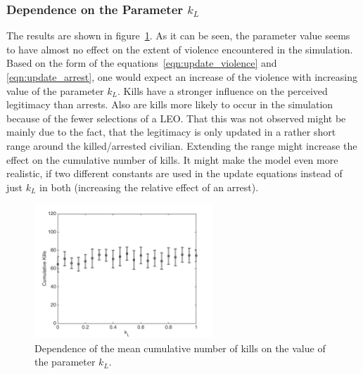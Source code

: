 \documentclass[11pt]{article}
\begin{document}
\subsubsection{Dependence on the Parameter $k_L$}
The results are shown in figure~\ref{fig:k_L_dep}. As it can be seen, the parameter value seems to have almost no effect on the extent of violence encountered in the simulation. Based on the form of the equations~\eqref{eqn:update_violence} and \eqref{eqn:update_arrest}, one would expect an increase of the violence with increasing value of the parameter $k_L$. Kills have a stronger influence on the perceived legitimacy than arrests. Also are kills more likely to occur in the simulation because of the fewer selections of a LEO. That this was not observed might be mainly due to the fact, that the legitimacy is only updated in a rather short range around the killed/arrested civilian. Extending the range might increase the effect on the cumulative number of kills. It might make the model even more realistic, if two different constants are used in the update equations instead of just $k_L$ in both (increasing the relative effect of an arrest).
\begin{figure}[!htbp]
	\centering
		\includegraphics[width=0.6\textwidth]{../../code/modified_model/k_L_dep.png}
	\caption{Dependence of the mean cumulative number of kills on the value of the parameter $k_L$.}
	\label{fig:k_L_dep}
\end{figure}
\end{document}
